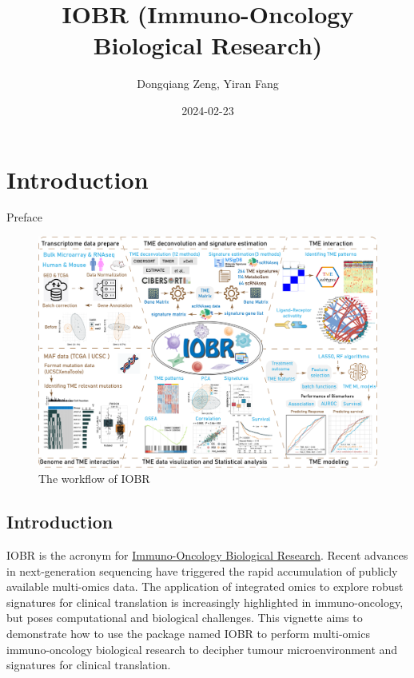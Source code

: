 \documentclass[
  12pt,
]{book}
\title{IOBR (Immuno-Oncology Biological Research)}
\author{Dongqiang Zeng, Yiran Fang}
\date{2024-02-23}
\begin{document}
\maketitle

{
\setcounter{tocdepth}{1}
\tableofcontents
}
\hypertarget{introduction}{%
\chapter*{\texorpdfstring{\textbf{Introduction}}{Introduction}}\label{introduction}}

Preface

\begin{figure}

{\centering \includegraphics[width=0.95\linewidth]{./fig/IOBR-Workflow} 

}

\caption{The workflow of IOBR}\label{fig:unnamed-chunk-1}
\end{figure}

\hypertarget{introduction-1}{%
\section{Introduction}\label{introduction-1}}

IOBR is the acronym for \href{https://github.com/IOBR/IOBR}{Immuno-Oncology Biological Research}.
Recent advances in next-generation sequencing have triggered the rapid accumulation of publicly available multi-omics data. The application of integrated omics to explore robust signatures for clinical translation is increasingly highlighted in immuno-oncology, but poses computational and biological challenges. This vignette aims to demonstrate how to use the package named IOBR to perform multi-omics immuno-oncology biological research to decipher tumour microenvironment and signatures for clinical translation.
\end{document}
